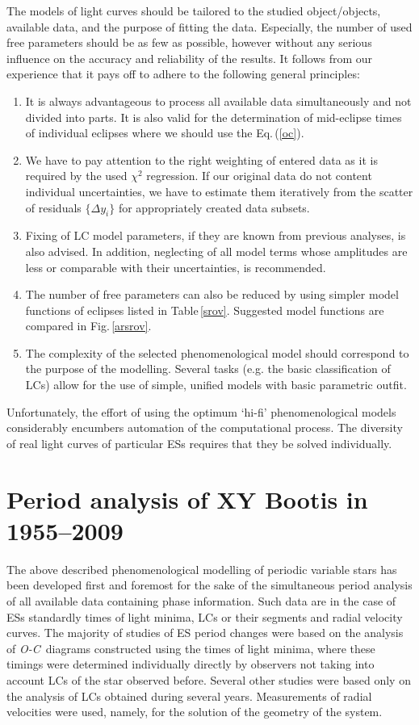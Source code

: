 \documentclass{aa}
\newcommand{\oc}{\textit{O-C}}
\begin{document}
The models of light curves should be tailored to the studied object/objects, available data, and the purpose of fitting the data. Especially, the number of used free parameters should be as few as possible, however without any serious influence on the accuracy and reliability of the results. It follows from our experience that it pays off to adhere to the following general principles:
\begin{enumerate}
\item It is always advantageous to process all available data simultaneously and not divided into parts. It is also valid for the determination of mid-eclipse times of individual eclipses where we should use the Eq.\,(\ref{oc}).
\item We have to pay attention to the right weighting of entered data as it is required by the used $\chi^2$ regression. If our original data do not content individual uncertainties, we have to estimate them iteratively from the scatter of residuals $\{\Delta y_i\}$ for appropriately created data subsets.
\item Fixing of LC model parameters, if they are known from previous analyses, is also advised. In addition, neglecting of all model terms whose amplitudes are less or comparable with their uncertainties, is recommended.
\item The number of free parameters can also be reduced by using simpler model functions of eclipses listed in Table\,\ref{srov}. Suggested model functions are compared in Fig.\,\ref{arsrov}.
\item The complexity of the selected phenomenological model should correspond to the purpose of the modelling. Several tasks (e.g. the basic classification of LCs) allow for the use of simple, unified models with basic parametric outfit.
\end{enumerate}
Unfortunately, the effort of using the optimum `hi-fi' phenomenological models considerably encumbers automation of the computational process. The diversity of real light curves of particular ESs requires that they be solved individually.



\section{Period analysis of XY Bootis in 1955--2009 } \label{xyperchng}

The above described phenomenological modelling of periodic variable stars has been developed first and foremost for the sake of the simultaneous period analysis of all available data containing phase information. Such data are in the case of ESs standardly times of light minima, LCs or their segments and radial velocity curves. The majority of studies of ES period changes were based on the analysis of \oc\ diagrams constructed using the times of light minima, where these timings were determined individually directly by observers not taking into account LCs of the star observed before. Several other studies were based only on the analysis of LCs obtained during several years. Measurements of radial velocities were used, namely, for the solution of the geometry of the system.
\end{document}
